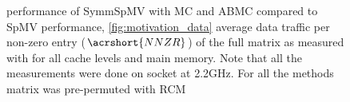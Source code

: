  \begin{figure}[thbp]
  	\centering
    \hspace{1em}
  	
  	\caption{ performance of \acrshort{SymmSpMV} with \acrshort{MC} and \acrshort{ABMC} compared to \acrshort{SpMV} performance, \cref{fig:motivation_data} average data traffic per non-zero entry ($\acrshort{NNZR}$) of the full matrix as measured with \LIKWID for all cache levels and main memory. Note that all the measurements were done on \IVB socket at 2.2GHz. For all the methods matrix was pre-permuted with \acrshort{RCM} }
  	\label{fig:motivation}
  \end{figure}
 
